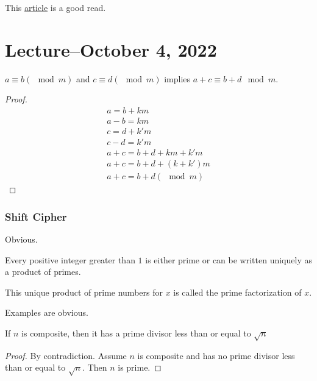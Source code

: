 \documentclass{scrreprt}
\begin{document}
\begin{remark}
	This \href{https://www.math.cmu.edu/~mradclif/teaching/127S19/Notes/Infinite%20Cardinality.pdf}{article} is a good read.
\end{remark}

\section{Lecture--October 4, 2022}

\begin{theorem}
	$a\equiv b(\mod m)$ and $c\equiv d(\mod m)$ implies $a + c \equiv b + d \mod m$.
	\begin{proof}
		\begin{align*}
			a = b + km                \\
			a - b = km                \\
			c = d + k'm               \\
			c - d = k'm               \\
			a + c = b + d + km + k'm  \\
			a + c = b + d + (k + k')m \\
			a + c = b + d (\mod m)
		\end{align*}
	\end{proof}
\end{theorem}

\subsubsection{Shift Cipher}
Obvious.

\begin{definition}
	Every positive integer greater than $1$ is either prime or can
	be written uniquely as a product of primes.

	This unique product of prime numbers for $x$ is called the prime factorization of $x$.
\end{definition}


Examples are obvious.

\begin{theorem}
	If $n$ is composite, then it has a prime divisor less than or equal to $\sqrt{n}$

	\begin{proof}
		By contradiction. Assume $n$ is composite and has no prime divisor less than or equal to $\sqrt{n}$. Then $n$ is prime.
	\end{proof}
\end{theorem}
\end{document}
